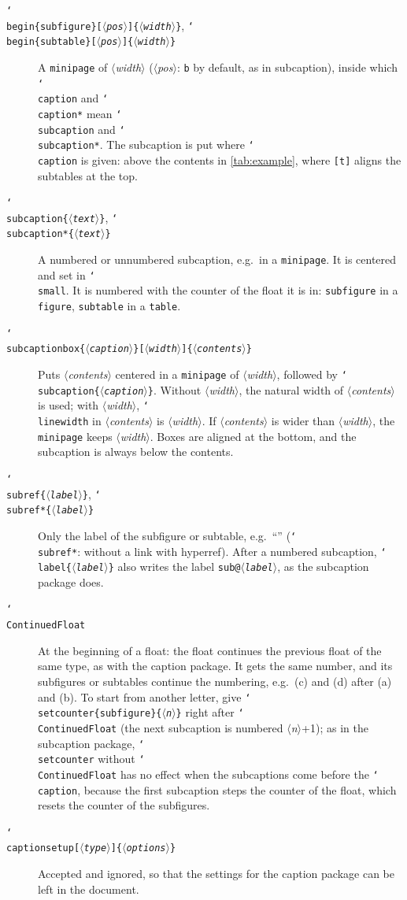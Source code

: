 \documentclass{article}
\newcommand*\cs[1]{\texttt{\char`\\#1}}
\newcommand*\pkg[1]{\textsf{#1}}
\newcommand*\env[1]{\texttt{#1}}
\newcommand*\meta[1]{\textnormal{$\langle$\textit{#1}$\rangle$}}
\begin{document}
\begin{description}
\item[\texttt{\char`\\begin\{subfigure\}[\meta{pos}]\{\meta{width}\}}, \texttt{\char`\\begin\{subtable\}[\meta{pos}]\{\meta{width}\}}]
  A \env{minipage} of \meta{width} (\meta{pos}: \texttt{b} by default,
  as in \pkg{subcaption}),
  inside which \cs{caption} and \cs{caption*} mean \cs{subcaption} and
  \cs{subcaption*}.  The subcaption is put where \cs{caption} is given:
  above the contents in \cref{tab:example}, where \texttt{[t]} aligns
  the subtables at the top.
\item[\texttt{\char`\\subcaption\{\meta{text}\}}, \texttt{\char`\\subcaption*\{\meta{text}\}}]
  A numbered or unnumbered subcaption, e.g.\ in a \env{minipage}.  It
  is centered and set in \cs{small}.  It is numbered with the counter
  of the float it is in: \texttt{subfigure} in a \env{figure},
  \texttt{subtable} in a \env{table}.
\item[\texttt{\char`\\subcaptionbox\{\meta{caption}\}[\meta{width}]\{\meta{contents}\}}]
  Puts \meta{contents} centered in a \env{minipage} of \meta{width},
  followed by \cs{subcaption}\texttt{\{\meta{caption}\}}.  Without
  \meta{width}, the natural width of \meta{contents} is used; with
  \meta{width}, \cs{linewidth} in \meta{contents} is \meta{width}.  If
  \meta{contents} is wider than \meta{width}, the \env{minipage} keeps
  \meta{width}.  Boxes are aligned at the bottom, and the subcaption
  is always below the contents.
\item[\texttt{\char`\\subref\{\meta{label}\}}, \texttt{\char`\\subref*\{\meta{label}\}}]
  Only the label of the subfigure or subtable, e.g.\ ``''
  (\cs{subref*}: without a link with \pkg{hyperref}).  After a numbered
  subcaption, \cs{label}\texttt{\{\meta{label}\}} also writes the label
  \texttt{sub@\meta{label}}, as the \pkg{subcaption} package does.
\item[\cs{ContinuedFloat}]
  At the beginning of a float: the float continues the previous float
  of the same type, as with the \pkg{caption} package.  It gets the
  same number, and its subfigures or subtables continue the numbering,
  e.g.\ (c) and (d) after (a) and (b).  To start from another letter,
  give \cs{setcounter}\texttt{\{subfigure\}\{\meta{n}\}} right after
  \cs{ContinuedFloat} (the next subcaption is numbered \meta{n}+1); as
  in the \pkg{subcaption} package, \cs{setcounter} without
  \cs{ContinuedFloat} has no effect when the subcaptions come before
  the \cs{caption}, because the first subcaption steps the counter of
  the float, which resets the counter of the subfigures.
\item[\texttt{\char`\\captionsetup[\meta{type}]\{\meta{options}\}}]
  Accepted and ignored, so that the settings for the \pkg{caption}
  package can be left in the document.
\end{description}
\end{document}
